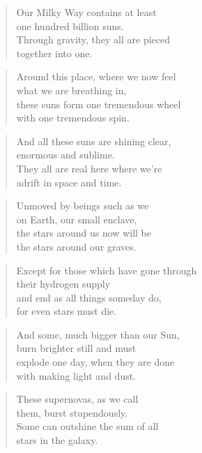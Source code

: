 \documentclass[10pt,a4paper]{article}
\begin{document}
\begin{multicols}{2}
\begin{verse}
Our Milky Way contains at least\\
one hundred billion suns.\\
Through gravity, they all are pieced\\
together into one.
\end{verse}

\begin{verse}
Around this place, where we now feel\\
what we are breathing in,\\
these suns form one tremendous wheel\\
with one tremendous spin.
\end{verse}

\begin{verse}
And all these suns are shining clear,\\
enormous and sublime.\\
They all are real here where we’re\\
adrift in space and time.
\end{verse}

\begin{verse}
Unmoved by beings such as we\\
on Earth, our small enclave,\\
the stars around us now will be\\
the stars around our graves.
\end{verse}

\begin{verse}
Except for those which have gone through\\
their hydrogen supply\\
and end as all things someday do,\\
for even stars must die.
\end{verse}

\begin{verse}
And some, much bigger than our Sun,\\
burn brighter still and must\\
explode one day, when they are done\\
with making light and dust.
\end{verse}

\begin{verse}
These supernovas, as we call\\
them, burst stupendously.\\
Some can outshine the sum of all\\
stars in the galaxy.
\end{verse}


\end{multicols}
\end{document}

